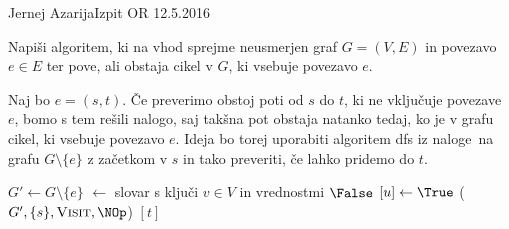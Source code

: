 \begin{naloga}{Jernej Azarija}{Izpit OR 12.5.2016}
\begin{vprasanje}
Napiši algoritem,
ki na vhod sprejme neusmerjen graf $G = (V, E)$ in povezavo $e \in E$
ter pove, ali obstaja cikel v $G$, ki vsebuje povezavo $e$.
\end{vprasanje}

\begin{odgovor}
Naj bo $e = (s, t)$. 
Če preverimo obstoj poti od $s$ do $t$, ki ne vključuje povezave $e$, 
bomo s tem rešili nalogo, saj takšna pot obstaja natanko tedaj, 
ko je v grafu cikel, ki vsebuje povezavo $e$.
Ideja bo torej uporabiti algoritem {\sc dfs} iz naloge~\nal[dfs]
na grafu $G \setminus \{e\}$ z začetkom v $s$ in tako preveriti,
če lahko pridemo do $t$.
\begin{small}
\begin{algorithmic}
	\State $G' \gets G \setminus \{e\}$
	 $\gets$ slovar s ključi $v \in V$ in vrednostmi $\False$
		$[u] \gets \True$
	\EndFunction
	($G', \{s\}, \text{\sc Visit}, \NOp$)
	\State {}$[t]$
\EndFunction
\end{algorithmic}
\end{small}
\end{odgovor}
\end{naloga}
